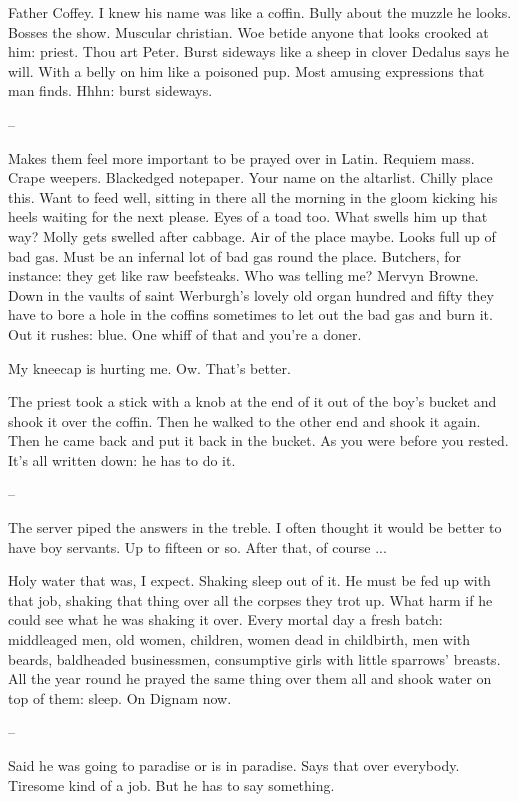 Father Coffey.
I knew his name was like a coffin.
Bully about the muzzle he looks.
Bosses the show.
Muscular christian.
Woe betide anyone that looks crooked at him:
priest.
Thou art Peter.
Burst sideways like a sheep in clover
Dedalus says he will.
With a belly on him like a poisoned pup.
Most amusing expressions that man finds.
Hhhn:
burst sideways.

--

Makes them feel more important to be prayed over in Latin.
Requiem mass.
Crape weepers.
Blackedged notepaper.
Your name on the altarlist.
Chilly place this.
Want to feed well, sitting in there all the morning
in the gloom kicking his heels
waiting for the next please.
Eyes of a toad too.
What swells him up that way?
Molly gets swelled after cabbage.
Air of the place maybe.
Looks full up of bad gas.
Must be an infernal lot of bad gas round the place.
Butchers, for instance:
they get like raw beefsteaks.
Who was telling me?
Mervyn Browne.
Down in the vaults of saint Werburgh's
lovely old organ hundred and fifty
they have to bore a hole in the coffins
sometimes to let out the bad gas and burn it.
Out it rushes:
blue.
One whiff of that and you're a doner.

My kneecap is hurting me.
Ow.
That's better.

The priest took a stick with a knob at the end of it
out of the boy's bucket and shook it over the coffin.
Then he walked to the other end and shook it again.
Then he came back and put it back in the bucket.
As you were before you rested.
It's all written down:
he has to do it.

--

The server piped the answers in the treble.
I often thought it would be better to have boy servants.
Up to fifteen or so.
After that, of course ...

Holy water that was, I expect.
Shaking sleep out of it.
He must be fed up with that job,
shaking that thing over all the corpses they trot up.
What harm if he could see what he was shaking it over.
Every mortal day a fresh batch:
middleaged men, old women, children,
women dead in childbirth,
men with beards, baldheaded businessmen,
consumptive girls with little sparrows' breasts.
All the year round
he prayed the same thing over them all and shook water on top of them:
sleep.
On Dignam now.

--

Said he was going to paradise or is in paradise.
Says that over everybody.
Tiresome kind of a job.
But he has to say something.

